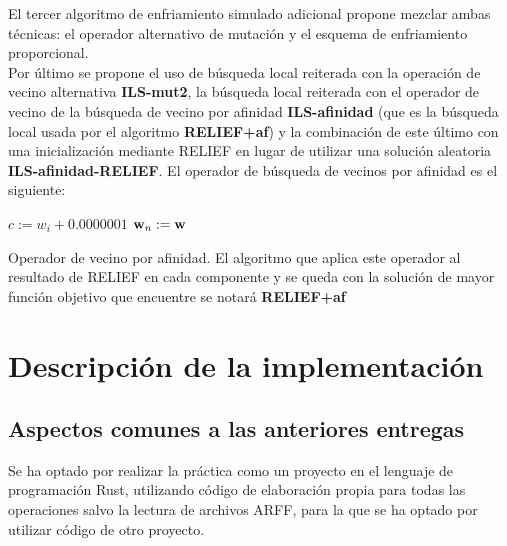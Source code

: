\documentclass{article}
\newenvironment{algo}{
	\vspace*{0.5cm}
	\begin{algorithm}[H]}{
	\end{algorithm}
	\vspace*{0.5cm}
}
\begin{document}
El tercer algoritmo de enfriamiento simulado adicional propone mezclar ambas técnicas: el operador alternativo de mutación y el esquema de enfriamiento proporcional. \\

Por último se propone el uso de búsqueda local reiterada con la operación de vecino alternativa \textbf{ILS-mut2}, la búsqueda local reiterada con el operador de vecino de la búsqueda de vecino por afinidad \textbf{ILS-afinidad} (que es la búsqueda local usada por el algoritmo \textbf{RELIEF+af}) y la combinación de este último con una inicialización mediante RELIEF en lugar de utilizar una solución aleatoria \textbf{ILS-afinidad-RELIEF}. El operador de búsqueda de vecinos por afinidad es el siguiente:

\begin{algo}
	
	$c := w_i + 0.0000001$
	$\normalfont \textbf w_n := \normalfont \textbf w$\;
	\vspace{0.2cm}
	\caption{Operador de vecino por afinidad. El algoritmo que aplica este operador al resultado de RELIEF en cada componente y se queda con la solución de mayor función objetivo que encuentre se notará \textbf{RELIEF+af}}
\end{algo}

\section{Descripción de la implementación}

\subsection*{Aspectos comunes a las anteriores entregas}

Se ha optado por realizar la práctica como un proyecto en el lenguaje de programación Rust, utilizando código de elaboración propia para todas las operaciones salvo la lectura de archivos ARFF, para la que se ha optado por utilizar código de otro proyecto. \\
\end{document}

